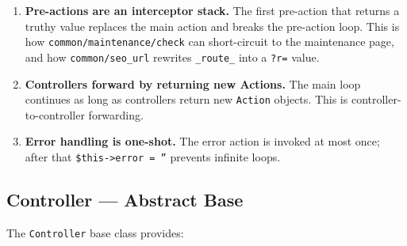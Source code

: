 \documentclass[11pt,a4paper]{article}
\begin{document}
\begin{enumerate}[leftmargin=1.6em,itemsep=2pt]
  \item \textbf{Pre-actions are an interceptor stack.} The first
        pre-action that returns a truthy value replaces the main
        action and breaks the pre-action loop. This is how
        \texttt{common/maintenance/check} can short-circuit to the
        maintenance page, and how \texttt{common/seo\_url} rewrites
        \texttt{\_route\_} into a \texttt{?r=} value.
  \item \textbf{Controllers forward by returning new Actions.} The
        main loop continues as long as controllers return new
        \texttt{Action} objects. This is controller-to-controller
        forwarding.
  \item \textbf{Error handling is one-shot.} The error action is
        invoked at most once; after that \texttt{\$this->error = ''}
        prevents infinite loops.
\end{enumerate}

\subsection{Controller --- Abstract Base}

The \texttt{Controller} base class provides:
\end{document}
